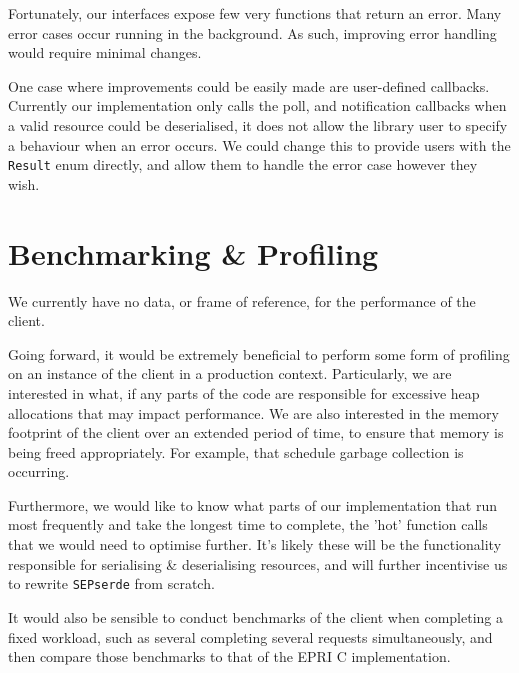 Fortunately, our interfaces expose few very functions that return an error. Many error cases occur running in the background. As such, improving error handling would require minimal changes.

One case where improvements could be easily made are user-defined callbacks. Currently our implementation only calls the poll, and notification callbacks when a valid resource could be deserialised, it does not allow the library user to specify a behaviour when an error occurs. We could change this to provide users with the \texttt{Result} enum directly, and allow them to handle the error case however they wish.   

\section{Benchmarking \& Profiling}
We currently have no data, or frame of reference, for the performance of the client. 

Going forward, it would be extremely beneficial to perform some form of profiling on an instance of the client in a production context. Particularly, we are interested in what, if any parts of the code are responsible for excessive heap allocations that may impact performance.
We are also interested in the memory footprint of the client over an extended period of time, to ensure that memory is being freed appropriately. For example, that schedule garbage collection is occurring. 

Furthermore, we would like to know what parts of our implementation that run most frequently and take the longest time to complete, the 'hot' function calls that we would need to optimise further. It's likely these will be the functionality responsible for serialising \& deserialising resources, and will further incentivise us to rewrite \texttt{SEPserde} from scratch.

It would also be sensible to conduct benchmarks of the client when completing a fixed workload, such as several completing several requests simultaneously, and then compare those benchmarks to that of the EPRI C implementation.






